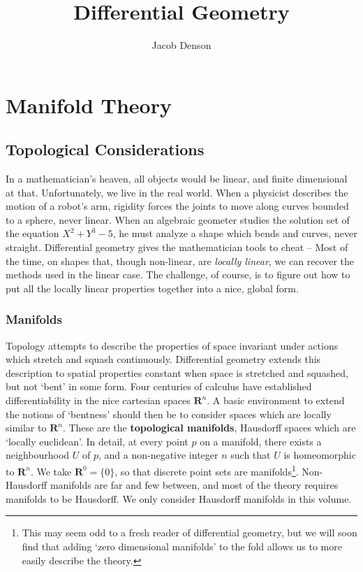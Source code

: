 

\title{Differential Geometry}
\author{Jacob Denson}



\maketitle
\tableofcontents
{}

\part{Manifold Theory}

\chapter{Topological Considerations}

In a mathematician's heaven, all objects would be linear, and finite dimensional at that. Unfortunately, we live in the real world. When a physicist describes the motion of a robot's arm, rigidity forces the joints to move along curves bounded to a sphere, never linear. When an algebraic geometer studies the solution set of the equation $X^2 + Y^3 - 5$, he must analyze a shape which bends and curves, never straight. Differential geometry gives the mathematician tools to cheat -- Most of the time, on shapes that, though non-linear, are {\it locally linear}, we can recover the methods used in the linear case. The challenge, of course, is to figure out how to put all the locally linear properties together into a nice, global form.

\section{Manifolds}

Topology attempts to describe the properties of space invariant under actions which stretch and squash continuously. Differential geometry extends this description to spatial properties constant when space is stretched and squashed, but not `bent' in some form. Four centuries of calculus have established differentiability in the nice cartesian spaces $\mathbf{R}^n$. A basic environment to extend the notions of `bentness' should then be to consider spaces which are locally similar to $\mathbf{R}^n$. These are the {\bf topological manifolds}, Hausdorff spaces which are `locally euclidean'. In detail, at every point $p$ on a manifold, there exists a neighbourhood $U$ of $p$, and a non-negative integer $n$ such that $U$ is homeomorphic to $\mathbf{R}^n$. We take $\mathbf{R}^0 = \{ 0 \}$, so that discrete point sets are manifolds\footnote{This may seem odd to a fresh reader of differential geometry, but we will soon find that adding `zero dimensional manifolds' to the fold allows us to more easily describe the theory.}. Non-Hausdorff manifolds are far and few between, and most of the theory requires manifolds to be Hausdorff. We only consider Hausdorff manifolds in this volume.


